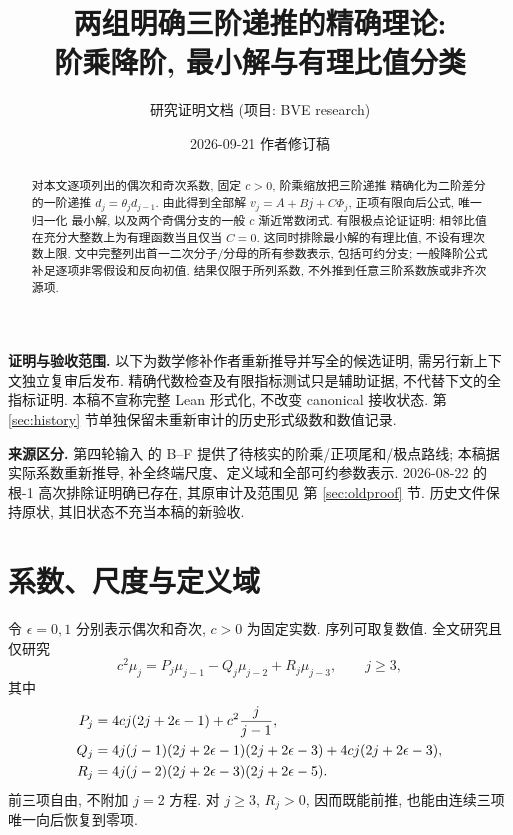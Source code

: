 \documentclass[UTF8]{ctexart}
\title{两组明确三阶递推的精确理论:\\阶乘降阶, 最小解与有理比值分类}
\author{研究证明文档 (项目: BVE research)}
\date{2026-09-21 作者修订稿}
\newcommand{\eps}{\epsilon}
\begin{document}
\maketitle

\begin{abstract}
对本文逐项列出的偶次和奇次系数, 固定 $c>0$, 阶乘缩放把三阶递推
精确化为二阶差分的一阶递推 $d_j=\theta_jd_{j-1}$.
由此得到全部解 $v_j=A+Bj+C\Phi_j$, 正项有限向后公式, 唯一归一化
最小解, 以及两个奇偶分支的一般 $c$ 渐近常数闭式.
有限极点论证证明: 相邻比值在充分大整数上为有理函数当且仅当 $C=0$.
这同时排除最小解的有理比值, 不设有理次数上限.
文中完整列出首一二次分子/分母的所有参数表示, 包括可约分支;
一般降阶公式补足逐项非零假设和反向初值.
结果仅限于所列系数, 不外推到任意三阶系数族或非齐次源项.
\end{abstract}

\noindent\textbf{证明与验收范围.}
以下为数学修补作者重新推导并写全的候选证明, 需另行新上下文独立复审后发布.
精确代数检查及有限指标测试只是辅助证据, 不代替下文的全指标证明.
本稿不宣称完整 Lean 形式化, 不改变 canonical 接收状态.
第 \ref{sec:history} 节单独保留未重新审计的历史形式级数和数值记录.

\medskip
\noindent\textbf{来源区分.}
第四轮输入 
的 B--F 提供了待核实的阶乘/正项尾和/极点路线;
本稿据实际系数重新推导, 补全终端尺度、定义域和全部可约参数表示.
2026-08-22 的根-1 高次排除证明确已存在, 其原审计及范围见
第 \ref{sec:oldproof} 节. 历史文件保持原状, 其旧状态不充当本稿的新验收.

\tableofcontents

\section{系数、尺度与定义域}

令 $\eps=0,1$ 分别表示偶次和奇次, $c>0$ 为固定实数. 序列可取复数值.
全文研究且仅研究
\begin{equation}\label{eq:mu}
 c^2\mu_j=P_j\mu_{j-1}-Q_j\mu_{j-2}+R_j\mu_{j-3},\qquad j\ge3,
\end{equation}
其中
\begin{align}\label{eq:coeff}
 P_j&=4cj(2j+2\eps-1)+c^2\frac{j}{j-1},\notag\\
 Q_j&=4j(j-1)(2j+2\eps-1)(2j+2\eps-3)+4cj(2j+2\eps-3),\\
 R_j&=4j(j-2)(2j+2\eps-3)(2j+2\eps-5).\notag
\end{align}
前三项自由, 不附加 $j=2$ 方程. 对 $j\ge3$, $R_j>0$,
因而既能前推, 也能由连续三项唯一向后恢复到零项.
\end{document}
